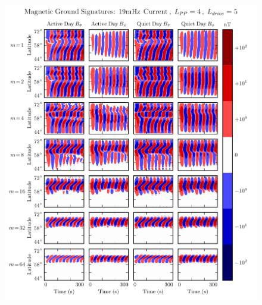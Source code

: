 \begin{figure}[!htb]
    \centering
    \includegraphics[width=\textwidth]{figures/ground_19mHz_day_4_5.pdf}
    \caption[Dayside Ground Magnetic Fields]{
    }
    \label{fig_ground_day}
\end{figure}


